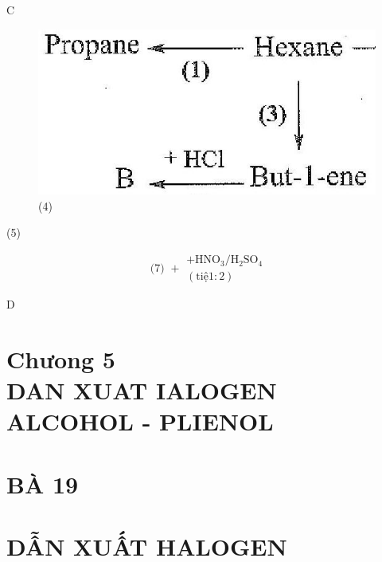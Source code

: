\documentclass[10pt]{article}
\begin{document}
C

\begin{figure}[h]
\begin{center}
  \includegraphics[width=\textwidth]{2025_10_23_fa9073eecee116ad8cf2g-62}
\captionsetup{labelformat=empty}
\caption{(4)}
\end{center}
\end{figure}

(5)

$$
\text { (7) }+\begin{gathered}
+\mathrm{HNO}_{3} / \mathrm{H}_{2} \mathrm{SO}_{4} \\
(\mathrm{ti} \mathrm{ệ} 1: 2)
\end{gathered}
$$

D

\section*{Chưong 5 \\
 DAN XUAT IALOGEN ALCOHOL - PLIENOL }
\section*{BÀ 19}
\section*{DẪN XUẤT HALOGEN}
\end{document}
